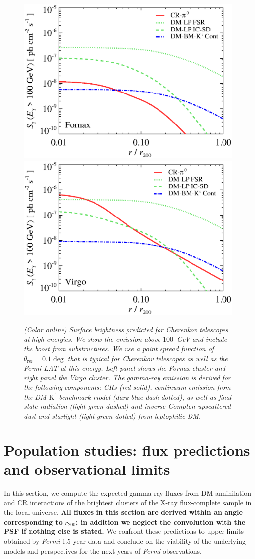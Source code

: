 \documentclass[10pt,aps,pra,reprint,amsmath,amsfonts,amssymb,showpacs,nofootinbib,floatfix]{revtex4-1}
\def\C#1{{\bf #1}}
\newcommand{\Fermi}{{\em Fermi}\xspace}
\newcommand{\rmn}{\mathrm}
\newcommand{\psf}{\theta_\rmn{res}}
\newcommand{\Kp}{\rmn{K}^\prime}
\newcommand{\rvir}{r_{200}}
\begin{document}
\begin{figure}
\begin{minipage}{2.0\columnwidth}
  \includegraphics[width=0.49\columnwidth]{figures/SB.Fornax.v14.SF700.SubMass.elmu.bw.eps}
  \includegraphics[width=0.49\columnwidth]{figures/SB.Virgo.v14.SF700.SubMass.elmu.bw.eps}
\caption{\it (Color online) Surface brightness predicted for Cherenkov
  telescopes at high energies. We show the emission above $100$~GeV
  and include the boost from substructures. We use a point spread
  function of $\psf=0.1\deg$ that is typical for Cherenkov telescopes
  as well as the \Fermi-LAT at this energy. Left panel shows the
  Fornax cluster and right panel the Virgo cluster. The gamma-ray
  emission is derived for the following components; CRs (red solid),
  continuum emission from the DM $\Kp$ benchmark model (dark blue
  dash-dotted), as well as final state radiation (light green dashed)
  and inverse Compton upscattered dust and starlight (light green
  dotted) from leptophilic DM.}
 \label{fig:SB_IACTs}
\end{minipage}
\end{figure}



\section{Population studies: flux predictions and observational limits}

In this section, we compute the expected gamma-ray fluxes from DM
annihilation and CR interactions of the brightest clusters of the
X-ray flux-complete sample in the local universe. \C{All fluxes in
  this section are derived within an angle corresponding to $\rvir$;
  in addition we neglect the convolution with the PSF if nothing else is
  stated.}  We confront these predictions to upper limits obtained by
\Fermi 1.5-year data and conclude on the viability of the underlying
models and perspectives for the next years of \Fermi observations.
\end{document}
